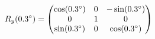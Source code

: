 \documentclass[preview]{standalone}
\begin{document}
\begin{align*}
\special{dvisvgm:raw <g id='unique000'>}R_y(0.3^\circ) = \begin{pmatrix} \cos(0.3^\circ) & 0 & -\sin(0.3^\circ) \\ 0 & 1 & 0 \\ \sin(0.3^\circ) & 0 & \cos(0.3^\circ) \end{pmatrix}\special{dvisvgm:raw </g>}
\end{align*}
\end{document}
